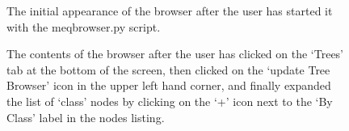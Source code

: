 \documentclass[10pt]{article}
\begin{document}
\begin{figure}
{\par\centering
{}
\par}
\caption {The initial appearance of the browser after the user has 
started it with the meqbrowser.py script.}
\label{fig:browser1}
\end{figure}

\begin{figure}
{\par\centering
{}
\par}
\caption {The contents of the browser after the user has clicked on the
`Trees' tab at the bottom of the screen, then clicked on the 
`update Tree Browser' icon in the upper left hand corner, and finally
expanded the list of `class' nodes by clicking on the `+' icon next to
the `By Class' label in the nodes listing.}
\label{fig:browser2}
\end{figure}
\end{document}
